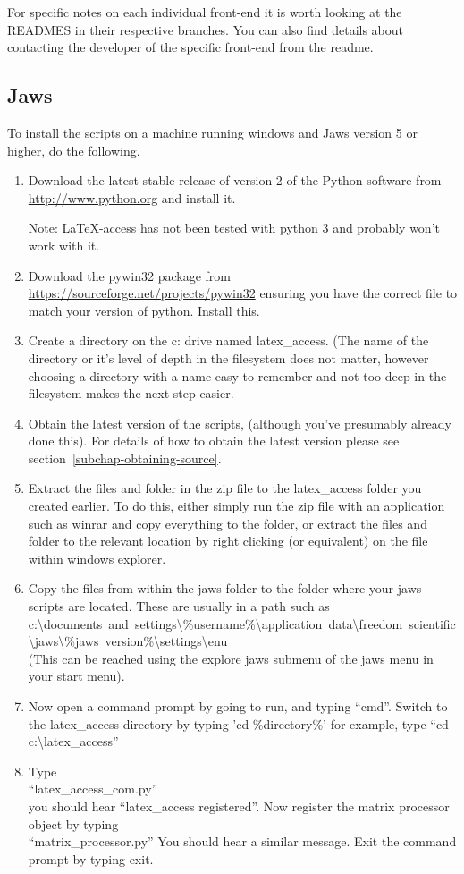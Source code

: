 \documentclass[12pt,a4paper]{report}
\begin{document}
For specific notes on each individual front-end it is worth looking at the
READMES in their respective branches. You can also find details about
contacting the developer of the specific front-end from the readme.

\subsection{Jaws}
\label{subsubchap-jaws}

To install the scripts on a machine running windows and Jaws
version 5 or higher, do the following.

\begin{enumerate}
\item Download the latest stable release of version 2 of the Python software from
\url{http://www.python.org} and install it.

Note: LaTeX-access has not been tested with python 3 and probably won't work with it.
\item Download the pywin32 package  from
\url{https://sourceforge.net/projects/pywin32} ensuring you have the correct
file to match your version of python. Install this.
\item Create a directory on the c: drive named latex\_access. (The name
of the directory or it's level of depth in the filesystem does not
matter, however choosing a directory with a name easy to remember and
not too deep in the filesystem makes the next step easier.
\item Obtain the latest version of the scripts, (although you've
presumably already done this).  For details of how to obtain the
latest version please see section~\ref{subchap-obtaining-source}.
\item Extract the files and folder in the zip file to the latex\_access
folder you created earlier. To do this, either simply run the zip file
with an application such as winrar and copy everything to the folder,
or extract the files and folder to the relevant location by right
clicking (or equivalent) on the file within windows explorer.
\item Copy the files from within the jaws folder to the folder where your
jaws scripts are located. These are usually in a path such as\\
\mbox{c:\textbackslash documents and settings\textbackslash\%username\%\textbackslash application data\textbackslash freedom scientific\textbackslash jaws\textbackslash\%jaws version\%\textbackslash settings\textbackslash enu}\\
(This can be reached using the explore jaws submenu of the jaws menu
in your start menu).
\item Now open a command prompt by going to run, and typing ``cmd''.
Switch to the latex\_access directory by typing 'cd \%directory\%' for
example, type ``cd c:\textbackslash latex\_access''
\item Type\\
``latex\_access\_com.py''\\
you should hear ``latex\_access registered''.  Now
register the matrix processor object by typing\\
``matrix\_processor.py''
You should hear a similar message.  Exit the command
prompt by typing exit.


\end{enumerate}
\end{document}
